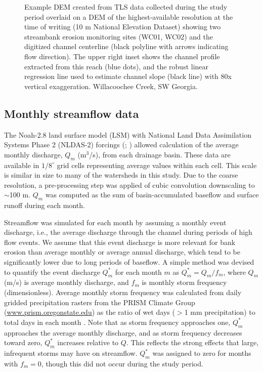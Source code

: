 \documentclass[preprint, review, authoryear, 12pt]{elsarticle}
\begin{document}
\begin{figure}
\centering
{}
\caption{Example DEM created from TLS data collected during the study period overlaid on a DEM of the highest-available resolution at the time of writing (10 m National Elevation Dataset) showing two streambank erosion monitoring sites (WC01, WC02) and the digitized channel centerline (black polyline with arrows indicating flow direction). The upper right inset shows the channel profile extracted from this reach (blue dots), and the robust linear regression line used to estimate channel slope (black line) with 80x vertical exaggeration. Willacoochee Creek, SW Georgia.}\label{fig:tls}
\end{figure}

\subsection{Monthly streamflow data}
The Noah-2.8 land surface model (LSM) with National Land Data Assimilation Systems Phase 2 (NLDAS-2) forcings (\citealp{Mitchell2004}; \citealp{Xia2012}) allowed calculation of the average monthly discharge,  $Q_m$ (m$^3$/s), from each drainage basin. These data are available in $1/8^{\circ}$ grid cells representing average values within each cell. This scale is similar in size to many of the watersheds in this study. Due to the coarse resolution, a pre-processing step was applied of cubic convolution downscaling to $\sim$100 m. $Q_m$ was computed as the sum of basin-accumulated baseflow and surface runoff during each month.

Streamflow was simulated for each month by assuming a monthly event discharge, i.e., the average discharge through the channel during periods of high flow events. We assume that this event discharge is more relevant for bank erosion than average monthly or average annual discharge, which tend to be significantly lower due to long periods of baseflow. A simple method was devised to quantify the event discharge $Q^*_m$ for each month $m$ as $Q^*_{m}=Q_m/f_m$, where $Q_m$ (m/s) is average monthly discharge, and $f_m$ is monthly storm frequency (dimensionless). Average monthly storm frequency was calculated from daily gridded precipitation rasters from the PRISM Climate Group (\url{www.prism.oregonstate.edu}) as the ratio of wet days ($>$1 mm precipitation) to total days in each month \citep{Rossi2015}. Note that as storm frequency approaches one, $Q^*_m$ approaches the average monthly discharge, and as storm frequency decreases toward zero, $Q^*_m$ increases relative to $Q$. This reflects the strong effects that large, infrequent storms may have on streamflow. $Q^*_m$ was assigned to zero for months with $f_m = 0$, though this did not occur during the study period.
\end{document}
